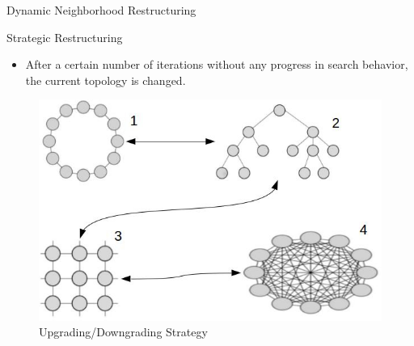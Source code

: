 \documentclass[table]{beamer}
\begin{document}
	\begin{frame}{Dynamic Neighborhood Restructuring}
		\begin{block}{Strategic Restructuring}
			\begin{itemize}{}
				\item After a certain number of iterations without any progress in search behavior, the current topology is changed.
			\end{itemize}
		\end{block}
		\begin{figure}[v]
			\includegraphics[scale=0.5]{restructuring}
			\centering
			\caption{Upgrading/Downgrading Strategy}
			\label{ref:restructuring}
		\end{figure}
	\end{frame}
	
	
\end{document}
